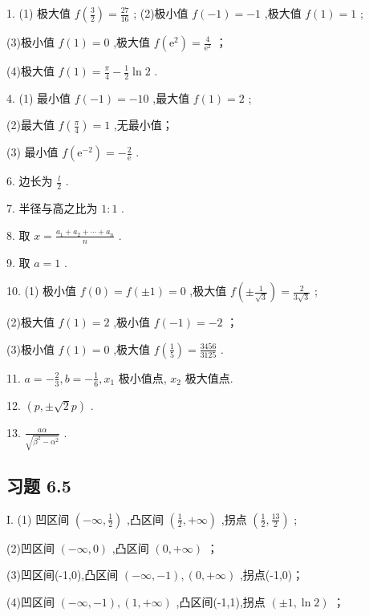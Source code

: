 1. (1) 极大值 \(f\left( \frac{3}{2}\right)  = \frac{27}{16}\) ; (2)极小值 \(f\left( {-1}\right)  =  - 1\) ,极大值 \(f\left( 1\right)  = 1\) ;

(3)极小值 \(f\left( 1\right)  = 0\) ,极大值 \(f\left( {\mathrm{e}}^{2}\right)  = \frac{4}{{\mathrm{e}}^{2}}\) ；

(4)极大值 \(f\left( 1\right)  = \frac{\pi }{4} - \frac{1}{2}\ln 2\) .

4. (1) 最小值 \(f\left( {-1}\right)  =  - {10}\) ,最大值 \(f\left( 1\right)  = 2\) ;

(2)最大值 \(f\left( \frac{\pi }{4}\right)  = 1\) ,无最小值；

(3) 最小值 \(f\left( {\mathrm{e}}^{-2}\right)  =  - \frac{2}{\mathrm{e}}\) .

6. 边长为 \(\frac{l}{2}\) .

7. 半径与高之比为 \(1 : 1\) .

8. 取 \(x = \frac{{a}_{1} + {a}_{2} + \cdots  + {a}_{n}}{n}\) .

9. 取 \(a = 1\) .

10. (1) 极小值 \(f\left( 0\right)  = f\left( {\pm 1}\right)  = 0\) ,极大值 \(f\left( {\pm \frac{1}{\sqrt{3}}}\right)  = \frac{2}{3\sqrt{3}}\) ;

(2)极大值 \(f\left( 1\right)  = 2\) ,极小值 \(f\left( {-1}\right)  =  - 2\) ；

(3)极小值 \(f\left( 1\right)  = 0\) ,极大值 \(f\left( \frac{1}{5}\right)  = \frac{3456}{3125}\) .

11. \(a =  - \frac{2}{3},b =  - \frac{1}{6},{x}_{1}\) 极小值点, \({x}_{2}\) 极大值点.

12. \(\left( {p, \pm  \sqrt{2}p}\right)\) .

13. \(\frac{a\alpha }{\sqrt{{\beta }^{2} - {\alpha }^{2}}}\) .

\subsection{习题 6.5}

I. (1) 凹区间 \(\left( {-\infty ,\frac{1}{2}}\right)\) ,凸区间 \(\left( {\frac{1}{2}, + \infty }\right)\) ,拐点 \(\left( {\frac{1}{2},\frac{13}{2}}\right)\) ;

(2)凹区间 \(\left( {-\infty ,0}\right)\) ,凸区间 \(\left( {0, + \infty }\right)\) ；

(3)凹区间(-1,0),凸区间 \(\left( {-\infty , - 1}\right) ,\left( {0, + \infty }\right)\) ,拐点(-1,0)；

(4)凹区间 \(\left( {-\infty , - 1}\right) ,\left( {1, + \infty }\right)\) ,凸区间(-1,1),拐点 \(\left( {\pm 1,\ln 2}\right)\) ；


